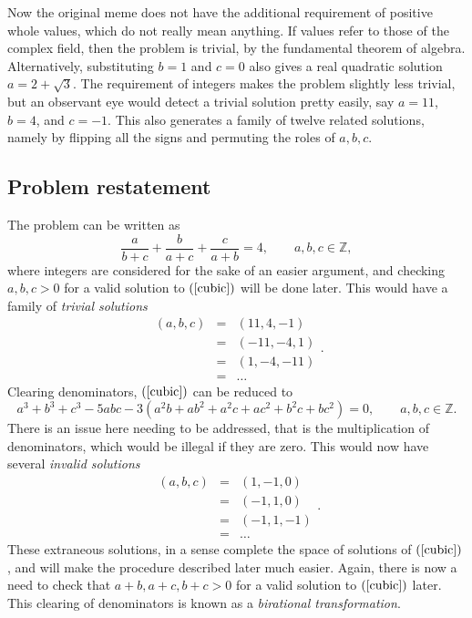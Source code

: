 \documentclass{article}
\newcommand{\rb}[1]{\left( #1 \right)}
\newcommand{\Z}{\mathbb{Z}}
\begin{document}
Now the original meme does not have the additional requirement of positive whole values, which do not really mean anything. If values refer to those of the complex field, then the problem is trivial, by the fundamental theorem of algebra. Alternatively, substituting $ b = 1 $ and $ c = 0 $ also gives a real quadratic solution $ a = 2 + \sqrt{3} $. The requirement of integers makes the problem slightly less trivial, but an observant eye would detect a trivial solution pretty easily, say $ a = 11 $, $ b = 4 $, and $ c = -1 $. This also generates a family of twelve related solutions, namely by flipping all the signs and permuting the roles of $ a, b, c $.

\subsection{Problem restatement}

The problem can be written as
\begin{equation}
\label{cubic}
\dfrac{a}{b + c} + \dfrac{b}{a + c} + \dfrac{c}{a + b} = 4, \qquad a, b, c \in \Z,
\end{equation}
where integers are considered for the sake of an easier argument, and checking $ a, b, c > 0 $ for a valid solution to $ \rb{\ref{cubic}} $ will be done later. This would have a family of \emph{trivial solutions}
$$
\begin{array}{lll}
\rb{a, b, c} & = & \rb{11, 4, -1} \\
& = & \rb{-11, -4, 1} \\
& = & \rb{1, -4, -11} \\
& = & \dots
\end{array}.
$$
Clearing denominators, $ \rb{\ref{cubic}} $ can be reduced to
\begin{equation}
\label{projective}
a^3 + b^3 + c^3 - 5abc - 3\rb{a^2b + ab^2 + a^2c + ac^2 + b^2c + bc^2} = 0, \qquad a, b, c \in \Z.
\end{equation}
There is an issue here needing to be addressed, that is the multiplication of denominators, which would be illegal if they are zero. This would now have several \emph{invalid solutions}
$$
\begin{array}{lll}
\rb{a, b, c} & = & \rb{1, -1, 0} \\
& = & \rb{-1, 1, 0} \\
& = & \rb{-1, 1, -1} \\
& = & \dots
\end{array}.
$$
These extraneous solutions, in a sense complete the space of solutions of $ \rb{\ref{cubic}} $, and will make the procedure described later much easier. Again, there is now a need to check that $ a + b, a + c, b + c > 0 $ for a valid solution to $ \rb{\ref{cubic}} $ later. This clearing of denominators is known as a \emph{birational transformation}.
\end{document}
